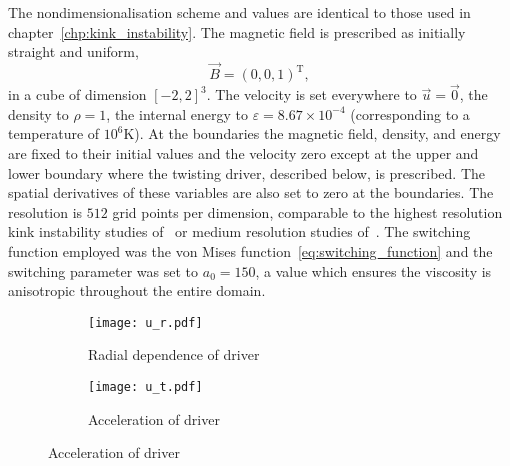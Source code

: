 The nondimensionalisation scheme and values are identical to those used in chapter~\ref{chp:kink_instability}. The magnetic field is prescribed as initially straight and uniform,
\begin{equation}
\vec{B} = (0, 0, 1)^{\text{T}},
\end{equation}
in a cube of dimension $[-2,2]^3$. The velocity is set everywhere to $\vec{u} = \vec{0}$, the density to $\rho = 1$, the internal energy to $\varepsilon = 8.67\times 10^{-4}$ (corresponding to a temperature of $10^6$K). At the boundaries the magnetic field, density, and energy are fixed to their initial values and the velocity zero except at the upper and lower boundary where the twisting driver, described below, is prescribed. The spatial derivatives of these variables are also set to zero at the boundaries. The resolution is $512$ grid points per dimension, comparable to the highest resolution kink instability studies of~\cite{hoodCoronalHeatingMagnetic2009} or medium resolution studies of~\cite{barefordShockHeatingNumerical2015}. The switching function employed was the von Mises function~\eqref{eq:switching_function} and the switching parameter was set to $a_0 = 150$, a value which ensures the viscosity is anisotropic throughout the entire domain. 

\begin{figure}[t]
  \centering
  \begin{subfigure}{.49\textwidth}
  \centering
  \texttt{[image: u\_r.pdf]}
  \caption{Radial dependence of driver}
  \label{fig:kink_radial_driver}
  \end{subfigure}
  \begin{subfigure}{.49\textwidth}
  \centering
  \texttt{[image: u\_t.pdf]}
  \caption{Acceleration of driver}
  \label{fig:kink_driver_accel}
  \end{subfigure}
  
  \label{fig:kink_driver}
\end{figure}

